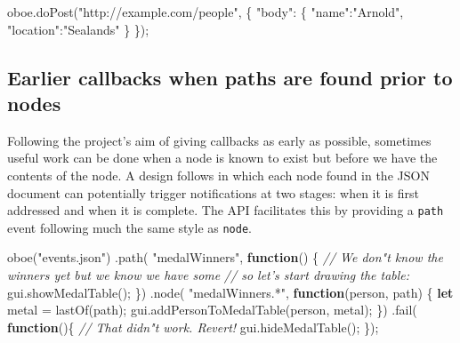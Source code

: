 \documentclass[12pt, ]{article}
\newenvironment{Shaded}{}{}
\newcommand{\KeywordTok}[1]{\textcolor[rgb]{0.00,0.44,0.13}{\textbf{{#1}}}}
\newcommand{\StringTok}[1]{\textcolor[rgb]{0.25,0.44,0.63}{{#1}}}
\newcommand{\CommentTok}[1]{\textcolor[rgb]{0.38,0.63,0.69}{\textit{{#1}}}}
\newcommand{\OtherTok}[1]{\textcolor[rgb]{0.00,0.44,0.13}{{#1}}}
\newcommand{\FunctionTok}[1]{\textcolor[rgb]{0.02,0.16,0.49}{{#1}}}
\newcommand{\NormalTok}[1]{{#1}}
\begin{document}
\begin{Shaded}
\begin{Highlighting}[]
\OtherTok{oboe}\NormalTok{.}\FunctionTok{doPost}\NormalTok{(}\StringTok{"http://example.com/people"}\NormalTok{, \{}
   \StringTok{"body"}\NormalTok{: \{}
      \StringTok{"name"}\NormalTok{:}\StringTok{"Arnold"}\NormalTok{, }\StringTok{"location"}\NormalTok{:}\StringTok{"Sealands"}
   \NormalTok{\}}
\NormalTok{\});}
\end{Highlighting}
\end{Shaded}

\subsection{Earlier callbacks when paths are found prior to
nodes}\label{earlier-callbacks-when-paths-are-found-prior-to-nodes}

Following the project's aim of giving callbacks as early as possible,
sometimes useful work can be done when a node is known to exist but
before we have the contents of the node. A design follows in which each
node found in the JSON document can potentially trigger notifications at
two stages: when it is first addressed and when it is complete. The API
facilitates this by providing a \texttt{path} event following much the
same style as \texttt{node}.

\begin{Shaded}
\begin{Highlighting}[]
\FunctionTok{oboe}\NormalTok{(}\StringTok{"events.json"}\NormalTok{)}
   \NormalTok{.}\FunctionTok{path}\NormalTok{( }\StringTok{"medalWinners"}\NormalTok{, }\KeywordTok{function}\NormalTok{() \{}
      \CommentTok{// We don"t know the winners yet but we know we have some }
      \CommentTok{// so let's start drawing the table:    }
      \OtherTok{gui}\NormalTok{.}\FunctionTok{showMedalTable}\NormalTok{();}
   \NormalTok{\})}
   \NormalTok{.}\FunctionTok{node}\NormalTok{( }\StringTok{"medalWinners.*"}\NormalTok{, }\KeywordTok{function}\NormalTok{(person, path) \{    }
      \KeywordTok{let} \NormalTok{metal = }\FunctionTok{lastOf}\NormalTok{(path);}
      \OtherTok{gui}\NormalTok{.}\FunctionTok{addPersonToMedalTable}\NormalTok{(person, metal);}
   \NormalTok{\})}
   \NormalTok{.}\FunctionTok{fail}\NormalTok{( }\KeywordTok{function}\NormalTok{()\{}
      \CommentTok{// That didn"t work. Revert!}
      \OtherTok{gui}\NormalTok{.}\FunctionTok{hideMedalTable}\NormalTok{();}
   \NormalTok{\});}
\end{Highlighting}
\end{Shaded}
\end{document}
